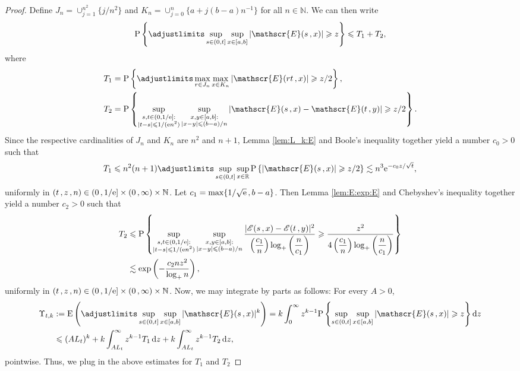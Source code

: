 \documentclass[reqno]{amsart}
\newcommand{\<}{\langle}
\renewcommand{\>}{\rangle}
\newcommand{\N}{\mathbb{N}}
\newcommand{\R}{\mathbb{R}}
\renewcommand{\P}{\mathrm{P}}
\newcommand{\E}{\mathrm{E}}
\newcommand{\1}{\mathbb{1}}
\renewcommand{\d}{{\rm d}}
\newcommand{\e}{{\rm e}}
\renewcommand{\ge}{\geqslant}
\renewcommand{\le}{\leqslant}
\theoremstyle{definition}
\numberwithin{equation}{section}
\begin{document}
\begin{proof}
	Define $J_n = \cup_{j=1}^{n^2}\{ j/n^2\}$ and
	$K_n = \cup_{j=0}^n \{ a + j(b-a)n^{-1}\}$ for all $n\in\N$.
	We can then write
	\[
		\P\left\{ \adjustlimits\sup_{s\in(0,t]}
		\sup_{x\in[a,b]} |\mathscr{E}(s\,,x)| \ge z\right\} 
		\le T_1 + T_2,
	\]
	where
	\begin{align*}
		T_1 &= \P\left\{ \adjustlimits\max_{r\in J_n}
			\max_{x\in K_n} |\mathscr{E}(r t \,,x)| \ge
			z/2\right\},\\
		T_2 &= \P\left\{\sup_{\substack{s,t\in (0,1/\e]:\\
			|t-s|\le 1/(\e n^2)}}
			\sup_{\substack{x,y\in [a,b]:\\
			|x-y|\le (b-a)/n}} |\mathscr{E}(s\,,x)-\mathscr{E}(t\,,y)| \ge
			z/2 \right\}.
	\end{align*}
	Since the respective cardinalities of $J_n$ and $K_n$ are $n^2$ and $n+1$, 
	Lemma \ref{lem:L_k:E} and Boole's inequality together yield
	a number $c_0>0$ such that
	\[
		T_1 \le n^2(n+1)\adjustlimits\sup_{s\in(0,t]}\sup_{x\in\R}
		\P\left\{ |\mathscr{E}(s\,,x)| 
		\ge z/2\right\} \lesssim n^3 \e^{-c_0z/\sqrt{t}},
	\]
	uniformly in $(t\,,z\,,n)\in(0\,,1/\e]\times(0\,,\infty)\times\N$. 
	Let $c_1 = \max\{ 1/\sqrt{\e}\,,b-a \}$.
	Then Lemma \ref{lem:E:exp:E} and Chebyshev's inequality together yield
	a number $c_2>0$ such that
	\begin{align*}
		T_2 &\le
			\P\left\{\sup_{\substack{s,t\in (0,1/\e]:\\|t-s|\le1/(\e n^2)}}
			\sup_{\substack{x,y\in [a,b]:\\
			|x-y|\le (b-a)/n}} \frac{|\mathscr{E}(s\,,x)-\mathscr{E}(t\,,y)|^2}{
			\left(\dfrac{c_1}{n}\right)\log_+\left(\dfrac{n}{c_1}\right)} \ge
			\frac{z^2}{4\left(\dfrac{c_1}{n}\right)
			\log_+\left(\dfrac{n}{c_1}\right)} \right\}\\
		&\lesssim\exp\left( - \frac{c_2nz^2}{\log_+ n}\right),
	\end{align*}
	uniformly in $(t\,,z\,,n)\in(0\,,1/\e]\times(0\,,\infty)\times\N$.
	Now, we may integrate
	by parts as follows: For every $A>0$,
	\begin{align*}
		\Upsilon_{t,k} &:= \E\left(\adjustlimits\sup_{s\in(0,t]}
			\sup_{x\in[a,b]} |\mathscr{E}(s\,,x)|^k\right) =
			k\int_0^\infty z^{k-1}\P\left\{ \sup_{s\in (0,t]}
			\sup_{x\in [a,b]} |\mathscr{E}(s\,,x)| \ge z\right\} \d z\\
		&\le (AL_t)^k + 
			k\int_{AL_t}^\infty z^{k-1} T_1 \,\d z
			+ k\int_{AL_t}^\infty z^{k-1} T_2\,\d z,
	\end{align*}
	pointwise. Thus, we plug in the above estimates for $T_1$ and $T_2$

\end{proof}
\end{document}
